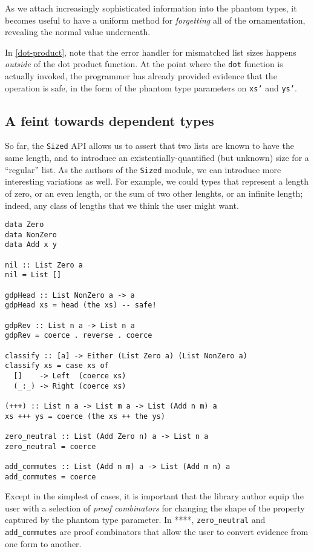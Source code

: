 \documentclass[format=sigplan, review=false, screen=true]{acmart}
\begin{document}
As we attach increasingly sophisticated information into the phantom types, it becomes useful to
have a uniform method for \emph{forgetting} all of the ornamentation, revealing the normal
value underneath.

In \cref{dot-product}, note that the error handler for mismatched list sizes happens
\emph{outside} of the dot product function. At the point where the \texttt{dot} function
is actually invoked, the programmer has already provided evidence that the operation is
safe, in the form of the phantom type parameters on \texttt{xs'} and \texttt{ys'}.

\subsection{A feint towards dependent types}
So far, the \texttt{Sized} API allows us to assert that two lists are known to have the same
length, and to introduce an existentially-quantified (but unknown) size for a ``regular'' list.
As the authors of the \texttt{Sized} module, we can introduce more interesting variations as
well. For example, we could types that represent a length of zero, or an even length, or the
sum of two other lenghts, or an infinite length; indeed, any class of lengths that we
think the user might want.

\begin{verbatim}
data Zero
data NonZero
data Add x y

nil :: List Zero a
nil = List []

gdpHead :: List NonZero a -> a
gdpHead xs = head (the xs) -- safe!

gdpRev :: List n a -> List n a
gdpRev = coerce . reverse . coerce

classify :: [a] -> Either (List Zero a) (List NonZero a)
classify xs = case xs of
  []    -> Left  (coerce xs)
  (_:_) -> Right (coerce xs)
  
(+++) :: List n a -> List m a -> List (Add n m) a
xs +++ ys = coerce (the xs ++ the ys)

zero_neutral :: List (Add Zero n) a -> List n a
zero_neutral = coerce

add_commutes :: List (Add n m) a -> List (Add m n) a
add_commutes = coerce
\end{verbatim}

Except in the simplest of cases, it is important that the library author equip the
user with a selection of \emph{proof combinators} for changing the shape of the
property captured by the phantom type parameter. In ****, \texttt{zero\_neutral}
and \texttt{add\_commutes} are proof combinators that allow the user to convert
evidence from one form to another.
\end{document}
